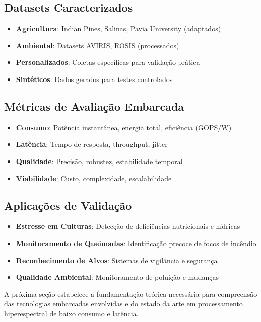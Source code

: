 \subsection{Datasets Caracterizados}
\begin{itemize}
    \item \textbf{Agricultura}: Indian Pines, Salinas, Pavia University (adaptados)
    \item \textbf{Ambiental}: Datasets AVIRIS, ROSIS (processados)
    \item \textbf{Personalizados}: Coletas específicas para validação prática
    \item \textbf{Sintéticos}: Dados gerados para testes controlados
\end{itemize}

\subsection{Métricas de Avaliação Embarcada}
\begin{itemize}
    \item \textbf{Consumo}: Potência instantânea, energia total, eficiência (GOPS/W)
    \item \textbf{Latência}: Tempo de resposta, throughput, jitter
    \item \textbf{Qualidade}: Precisão, robustez, estabilidade temporal
    \item \textbf{Viabilidade}: Custo, complexidade, escalabilidade
\end{itemize}

\subsection{Aplicações de Validação}
\begin{itemize}
    \item \textbf{Estresse em Culturas}: Detecção de deficiências nutricionais e hídricas
    \item \textbf{Monitoramento de Queimadas}: Identificação precoce de focos de incêndio
    \item \textbf{Reconhecimento de Alvos}: Sistemas de vigilância e segurança
    \item \textbf{Qualidade Ambiental}: Monitoramento de poluição e mudanças
\end{itemize}

A próxima seção estabelece a fundamentação teórica necessária para compreensão das tecnologias embarcadas envolvidas e do estado da arte em processamento hiperespectral de baixo consumo e latência.
